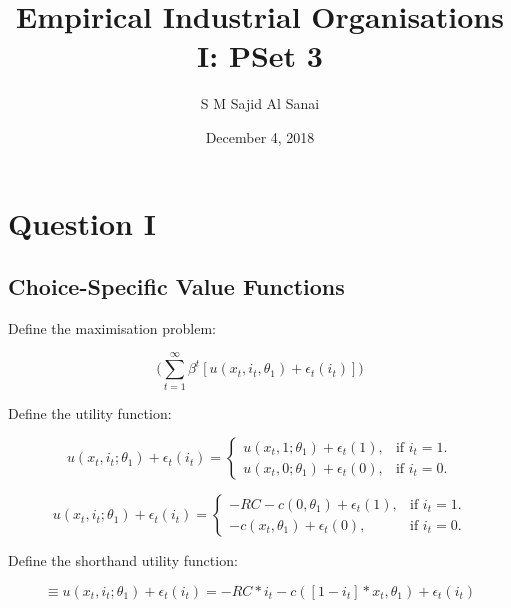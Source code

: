 \documentclass{article}
\title{Empirical Industrial Organisations I: PSet 3}
\author{S M Sajid Al Sanai}
\date{December 4, 2018}
\begin{document}
\maketitle
{}
\tableofcontents


\newpage

\section{Question I}

\subsection{Choice-Specific Value Functions}

Define the maximisation problem:

\begin{equation}
\Big( \sum_{t=1} ^{\infty} \beta^t[ u(x_t,i_t,\theta_1) + \epsilon_t(i_t) ] \Big)
\end{equation}

\noindent Define the utility function:

\begin{equation}
  u( x_t, i_t; \theta_1 ) + \epsilon_t( i_t ) =\begin{cases}
    u( x_t, 1; \theta_1 ) + \epsilon_t( 1 ), & \text{if $i_t=1$}.\\
    u( x_t, 0; \theta_1 ) + \epsilon_t( 0 ), & \text{if $i_t=0$}.
  \end{cases}
\end{equation}

\begin{equation}
  u( x_t, i_t; \theta_1 ) + \epsilon_t( i_t ) =\begin{cases}
    -RC - c( 0, \theta_1 ) + \epsilon_t( 1 ), & \text{if $i_t=1$}.\\
    -c( x_t, \theta_1 ) + \epsilon_t( 0 ), & \text{if $i_t=0$}.
  \end{cases}
\end{equation}

\noindent Define the shorthand utility function:

\begin{equation}
\equiv u( x_t, i_t; \theta_1 ) + \epsilon_t( i_t ) = -RC * i_t - c( [ 1 - i_t ] * x_t, \theta_1 ) + \epsilon_t( i_t )
\end{equation}
\end{document}

